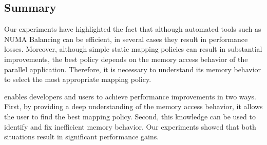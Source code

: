 \subsection{Summary}

Our experiments have highlighted the fact that although automated tools such
as NUMA Balancing can be efficient, in several cases they result in
performance losses. Moreover, although simple static mapping policies
can result in substantial improvements, the best policy depends on the memory access behavior of the parallel application. Therefore, it is necessary to understand its memory behavior to
select the most appropriate mapping policy.

\TABARNAC enables developers and users to achieve performance improvements in two ways. First, by
providing a deep understanding of the memory access behavior, it allows the user to
find the best mapping policy. Second, this knowledge can be used to
identify and fix inefficient memory behavior. Our experiments showed that both
situations result in significant performance gains.
